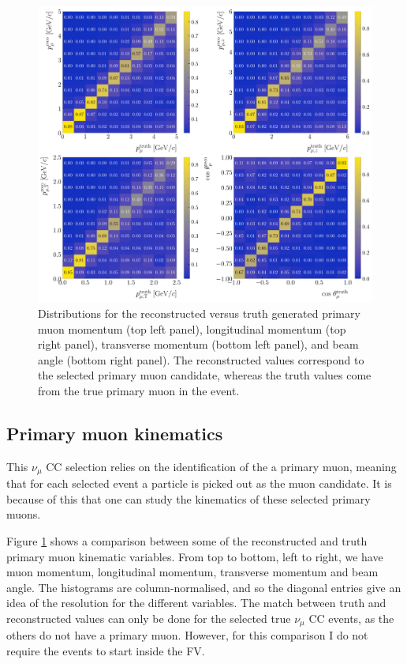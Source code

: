 \begin{figure}[t]
    \centering
    \includegraphics[width=.99\linewidth]{Images/GAr_selection/numuCC_muon_kinematic_comp.pdf}
    \caption{Distributions for the reconstructed versus truth generated primary muon momentum (top left panel), longitudinal momentum (top right panel), transverse momentum (bottom left panel), and beam angle (bottom right panel). The reconstructed values correspond to the selected primary muon candidate, whereas the truth values come from the true primary muon in the event.}
    \label{fig:numuCC_muon_kinematic_comp}
\end{figure}

\subsection{Primary muon kinematics}

This $\nu_{\mu}$ CC selection relies on the identification of the a primary muon, meaning that for each selected event a particle is picked out as the muon candidate. It is because of this that one can study the kinematics of these selected primary muons.

Figure \ref{fig:numuCC_muon_kinematic_comp} shows a comparison between some of the reconstructed and truth primary muon kinematic variables. From top to bottom, left to right, we have muon momentum, longitudinal momentum, transverse momentum and beam angle. The histograms are column-normalised, and so the diagonal entries give an idea of the resolution for the different variables. The match between truth and reconstructed values can only be done for the selected true $\nu_{\mu}$ CC events, as the others do not have a primary muon. However, for this comparison I do not require the events to start inside the FV.

